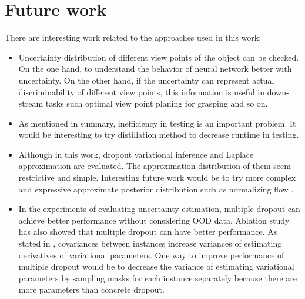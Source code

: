 \section{Future work}
There are interesting work related to the approaches used in this work:
\begin{itemize}
	\item Uncertainty distribution of different view points of the object can be checked. On the one hand, to understand the behavior of neural network better with uncertainty. On the other hand, if the uncertainty can represent actual discriminability of different view points, this information is useful in down-stream tasks such optimal view point planing for grasping and so on. 
	\item As mentioned in summary, inefficiency in testing is an important problem. It would be interesting to try distillation method to decrease runtime in testing.
	\item Although in this work, dropout variational inference and Laplace approximation are evaluated. The approximation distribution of them seem restrictive and simple. Interesting future work would be to try more complex and expressive approximate posterior distribution such as normalizing flow .
	\item In the experiments of evaluating uncertainty estimation, multiple dropout can achieve better performance without considering OOD data. Ablation study has also showed that multiple dropout can have better performance. As stated in \cite{kingma2015variational}, covariances between instances increase variances of estimating derivatives of variational parameters. One way to improve performance of multiple dropout would be to decrease the variance of estimating variational parameters by sampling masks for each instance separately because there are more parameters than concrete dropout. 
\end{itemize}